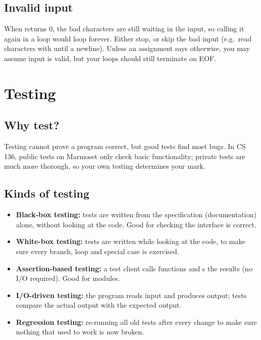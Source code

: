 \subsection{Invalid input}

When  returns 0, the bad characters are still waiting in the input, so
calling it again in a loop would loop forever. Either stop, or skip the bad input (e.g.\ read
characters with  until a newline). Unless an assignment says otherwise, you may
assume input is valid, but your loops should still terminate on EOF.

\section{Testing}

\subsection{Why test?}

Testing cannot prove a program correct, but good tests find most bugs. In CS 136, public tests
on Marmoset only check basic functionality; private tests are much more thorough, so your own
testing determines your mark.

\subsection{Kinds of testing}

\begin{itemize}
  \item \textbf{Black-box testing:} tests are written from the specification (documentation)
    alone, without looking at the code. Good for checking the interface is correct.
  \item \textbf{White-box testing:} tests are written while looking at the code, to make sure
    every branch, loop and special case is exercised.
  \item \textbf{Assertion-based testing:} a test client calls functions and s the
    results (no I/O required). Good for modules.
  \item \textbf{I/O-driven testing:} the program reads input and produces output; tests compare
    the actual output with the expected output.
  \item \textbf{Regression testing:} re-running all old tests after every change to make sure
    nothing that used to work is now broken.
\end{itemize}

